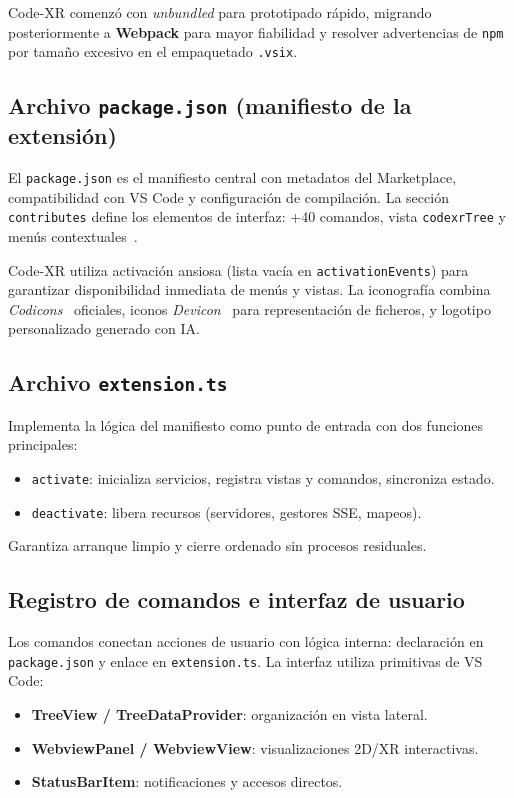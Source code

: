 \documentclass[a4paper, 12pt]{book}
\begin{document}
Code-XR comenzó con \emph{unbundled} para prototipado rápido, migrando posteriormente a \textbf{Webpack} para mayor fiabilidad y resolver advertencias de \texttt{npm} por tamaño excesivo en el empaquetado \texttt{.vsix}.

\subsection{Archivo \texttt{package.json} (manifiesto de la extensión)}
El \texttt{package.json} es el manifiesto central con metadatos del Marketplace, compatibilidad con VS Code y configuración de compilación. La sección \texttt{contributes} define los elementos de interfaz: +40 comandos, vista \texttt{codexrTree} y menús contextuales~\cite{vscode-bundling}.

Code-XR utiliza activación ansiosa (lista vacía en \texttt{activationEvents}) para garantizar disponibilidad inmediata de menús y vistas. La iconografía combina \emph{Codicons}~\cite{codicons} oficiales, iconos \emph{Devicon}~\cite{devicon} para representación de ficheros, y logotipo personalizado generado con IA.

\subsection{Archivo \texttt{extension.ts}}
Implementa la lógica del manifiesto como punto de entrada con dos funciones principales:
\begin{itemize}
  \item \texttt{activate}: inicializa servicios, registra vistas y comandos, sincroniza estado.
  \item \texttt{deactivate}: libera recursos (servidores, gestores SSE, mapeos).
\end{itemize}

Garantiza arranque limpio y cierre ordenado sin procesos residuales.

\subsection{Registro de comandos e interfaz de usuario}
Los comandos conectan acciones de usuario con lógica interna: declaración en \texttt{package.json} y enlace en \texttt{extension.ts}. La interfaz utiliza primitivas de VS Code:
\begin{itemize}
  \item \textbf{TreeView / TreeDataProvider}: organización en vista lateral.
  \item \textbf{WebviewPanel / WebviewView}: visualizaciones 2D/XR interactivas.
  \item \textbf{StatusBarItem}: notificaciones y accesos directos.
\end{itemize}
\end{document}
